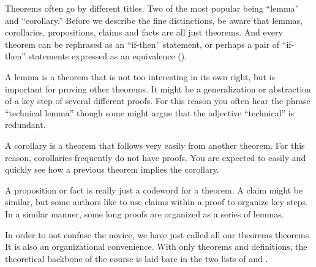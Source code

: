 \begin{para}Theorems often go by different titles.  Two of the most popular being ``lemma'' and ``corollary.''   Before we describe the fine distinctions, be aware that lemmas, corollaries, propositions, claims and facts are all just theorems.  And every theorem can be rephrased as an ``if-then'' statement, or perhaps a pair of ``if-then'' statements expressed as an equivalence ().\end{para}
%
\begin{para}A lemma is a theorem that is not too interesting in its own right, but is important for proving other theorems.  It might be a generalization or abstraction of a key step of several different proofs.  For this reason you often hear the phrase ``technical lemma'' though some might argue that the adjective ``technical'' is redundant.\end{para}
%
\begin{para}A corollary is a theorem that follows very easily from another theorem.  For this reason, corollaries frequently do not have proofs.  You are expected to easily and quickly see how a previous theorem implies the corollary.\end{para}
%
\begin{para}A proposition or fact is really just a codeword for a theorem.  A claim might be similar, but some authors like to use claims within a proof to organize key steps.  In a similar manner, some long proofs are organized as a series of lemmas.\end{para}
%
\begin{para}In order to not confuse the novice, we have just called all our theorems theorems.  It is also an organizational convenience.  With only theorems and definitions, the theoretical backbone of the course is laid bare in the two lists of  and .\end{para}
